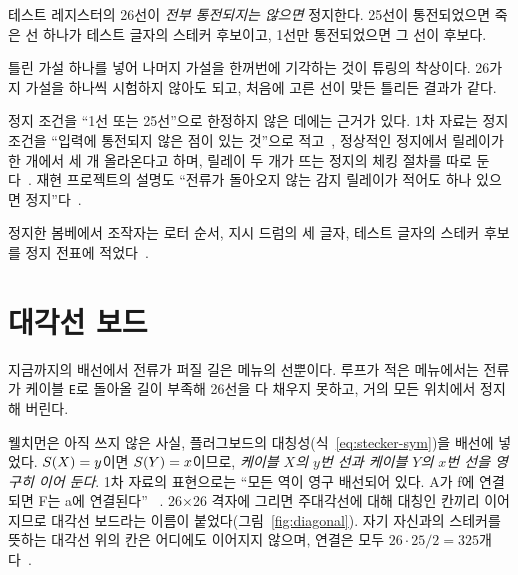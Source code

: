 \begin{keybox}[title={정지 조건}]
테스트 레지스터의 26선이 \emph{전부 통전되지는 않으면} 정지한다. 25선이 통전되었으면 죽은 선 하나가
테스트 글자의 스테커 후보이고, 1선만 통전되었으면 그 선이 후보다.
\end{keybox}

틀린 가설 하나를 넣어 나머지 가설을 한꺼번에 기각하는 것이 튜링의 착상이다. 26가지 가설을 하나씩
시험하지 않아도 되고, 처음에 고른 선이 맞든 틀리든 결과가 같다.

정지 조건을 ``1선 또는 25선''으로 한정하지 않은 데에는 근거가 있다. 1차 자료는 정지 조건을 ``입력에
통전되지 않은 점이 있는 것''으로 적고~\cite[32]{us6812report1944}, 정상적인 정지에서 릴레이가 한 개에서
세 개 올라온다고 하며, 릴레이 두 개가 뜨는 정지의 체킹 절차를 따로 둔다~\cite[32, 50]{us6812report1944}.
재현 프로젝트의 설명도 ``전류가 돌아오지 않는 감지 릴레이가 적어도 하나 있으면 정지''다~\cite{jackson-bh10}.

정지한 봄베에서 조작자는 로터 순서, 지시 드럼의 세 글자, 테스트 글자의 스테커 후보를 정지 전표에
적었다~\cite[49]{us6812report1944}.

\section{대각선 보드}\label{sec:diagonal}

지금까지의 배선에서 전류가 퍼질 길은 메뉴의 선뿐이다. 루프가 적은 메뉴에서는 전류가 케이블
\texttt{E}로 돌아올 길이 부족해 26선을 다 채우지 못하고, 거의 모든 위치에서 정지해 버린다.

웰치먼은 아직 쓰지 않은 사실, 플러그보드의 대칭성(식~\eqref{eq:stecker-sym})을 배선에 넣었다.
$S(X)=y$이면 $S(Y)=x$이므로, \emph{케이블 $X$의 $y$번 선과 케이블 $Y$의 $x$번 선을 영구히 이어 둔다}.
1차 자료의 표현으로는 ``모든 역이 영구 배선되어 있다. A가 f에 연결되면 F는 a에 연결된다''%
~\cite[6]{us6812report1944}. 26×26 격자에 그리면 주대각선에 대해 대칭인 칸끼리 이어지므로 대각선
보드라는 이름이 붙었다(그림~\ref{fig:diagonal}). 자기 자신과의 스테커를 뜻하는 대각선 위의 칸은 어디에도
이어지지 않으며, 연결은 모두 $26\cdot25/2 = 325$개다~\cite{ellsbury1998bombe}.

